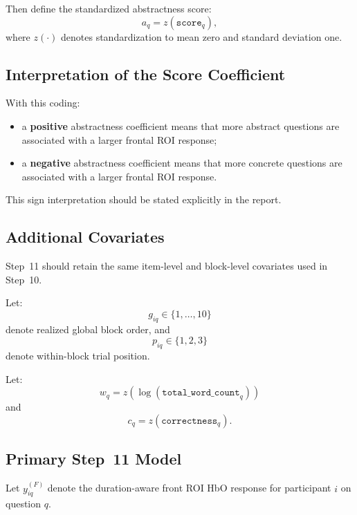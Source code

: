 Then define the standardized abstractness score:
\begin{equation}
a_q = z(\texttt{score}_q),
\end{equation}
where \(z(\cdot)\) denotes standardization to mean zero and standard deviation one.

\subsection{Interpretation of the Score Coefficient}
With this coding:
\begin{itemize}
    \item a \textbf{positive} abstractness coefficient means that more abstract questions are associated
    with a larger frontal ROI response;
    \item a \textbf{negative} abstractness coefficient means that more concrete questions are associated
    with a larger frontal ROI response.
\end{itemize}

This sign interpretation should be stated explicitly in the report.

\subsection{Additional Covariates}
Step~11 should retain the same item-level and block-level covariates used in Step~10.

Let:
\begin{equation}
g_{iq} \in \{1,\dots,10\}
\end{equation}
denote realized global block order, and
\begin{equation}
p_{iq} \in \{1,2,3\}
\end{equation}
denote within-block trial position.

Let:
\begin{equation}
w_q = z\!\left(\log(\texttt{total\_word\_count}_q)\right)
\end{equation}
and
\begin{equation}
c_q = z(\texttt{correctness}_q).
\end{equation}

\subsection{Primary Step~11 Model}
Let \(y^{(F)}_{iq}\) denote the duration-aware front ROI HbO response for participant \(i\) on question \(q\).

